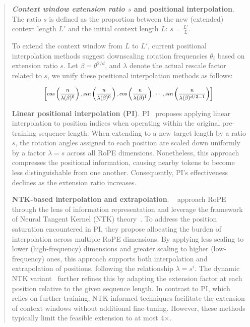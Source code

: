 \begin{abstract}
\textbf{\emph{Context window extension ratio $s$} and positional interpolation}. The ratio $s$ is defined as the proportion between the new (extended) context length $L'$ and the initial context length $L$: $s=\frac{L'}{L}$.

To extend the context window from $L$ to $L'$, current positional interpolation methods suggest downscaling rotation frequencies $\theta_i$ based on extension ratio $s$. Let $\beta=\theta^{2/d}$, and $\lambda$ denote the actual rescale factor related to $s$, we   unify these positional interpolation methods as follows:

\begin{equation}	
	\fontsize{7.5}{7.5} \selectfont
	\label{eq:unified_rope}
	\begin{aligned}
		\left[cos\left(\frac{n}{\lambda(\beta)^0}\right), sin \left(\frac{n}{\lambda(\beta)^0}\right), cos\left(\frac{n}{\lambda(\beta)^1}\right), \cdot\cdot\cdot,  sin \left(\frac{n}{\lambda(\beta)^{d/2-1}}\right) \right]   
	\end{aligned}
\end{equation}

\textbf{Linear positional interpolation (PI)}. PI~\cite{pi} proposes applying linear interpolation to position indices when operating within the original pre-training sequence length. When extending to a new target length by a ratio $s$, the rotation angles assigned to each position are scaled down uniformly by a factor $\lambda=s$ across all RoPE dimensions. Nonetheless, this approach compresses the positional information, causing nearby tokens to become less distinguishable from one another. Consequently, PI's effectiveness declines as the extension ratio increases.

\textbf{NTK-based interpolation and extrapolation}. ~\cite{ntk,dynamicntk} approach RoPE through the lens of information representation and leverage the framework of Neural Tangent Kernel (NTK) theory~\cite{jacot2018neural,tancik2020fourier}. To address the position saturation encountered in PI, they propose allocating the burden of interpolation across multiple RoPE dimensions. By applying less scaling to lower (high-frequency) dimensions and greater scaling to higher (low-frequency) ones, this approach supports both interpolation and extrapolation of positions, following the relationship $\lambda=s^{i}$. The dynamic NTK variant~\cite{dynamicntk} further refines this by adapting the extension factor at each position relative to the given sequence length. In contrast to PI, which relies on further training, NTK-informed techniques facilitate the extension of context windows without additional fine-tuning. However, these methods typically limit the feasible extension to at most 4$\times$.


\end{abstract}
